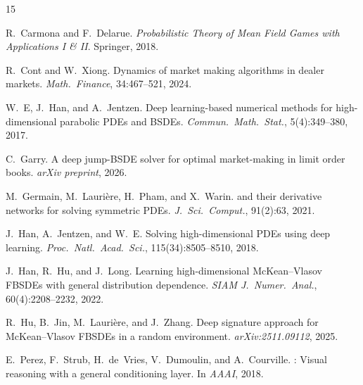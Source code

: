 \documentclass[11pt,a4paper]{article}
\begin{document}
\begin{thebibliography}{15}

R.~Carmona and F.~Delarue.
\newblock \emph{Probabilistic Theory of Mean Field Games with Applications {I \& II}}.
\newblock Springer, 2018.

R.~Cont and W.~Xiong.
\newblock Dynamics of market making algorithms in dealer markets.
\newblock \emph{Math.\ Finance}, 34:467--521, 2024.

W.~E, J.~Han, and A.~Jentzen.
\newblock Deep learning-based numerical methods for high-dimensional parabolic PDEs and BSDEs.
\newblock \emph{Commun.\ Math.\ Stat.}, 5(4):349--380, 2017.

C.~Garry.
\newblock A deep jump-{BSDE} solver for optimal market-making in limit order books.
\newblock \emph{arXiv preprint}, 2026.

M.~Germain, M.~Lauri\`ere, H.~Pham, and X.~Warin.
 and their derivative networks for solving symmetric {PDE}s.
\newblock \emph{J.\ Sci.\ Comput.}, 91(2):63, 2021.

J.~Han, A.~Jentzen, and W.~E.
\newblock Solving high-dimensional PDEs using deep learning.
\newblock \emph{Proc.\ Natl.\ Acad.\ Sci.}, 115(34):8505--8510, 2018.

J.~Han, R.~Hu, and J.~Long.
\newblock Learning high-dimensional {McKean--Vlasov} FBSDEs with general distribution dependence.
\newblock \emph{SIAM J.\ Numer.\ Anal.}, 60(4):2208--2232, 2022.

R.~Hu, B.~Jin, M.~Lauri\`ere, and J.~Zhang.
\newblock Deep signature approach for {McKean--Vlasov FBSDEs} in a random environment.
\newblock \emph{arXiv:2511.09112}, 2025.

E.~Perez, F.~Strub, H.~de~Vries, V.~Dumoulin, and A.~Courville.
: Visual reasoning with a general conditioning layer.
\newblock In \emph{AAAI}, 2018.

\end{thebibliography}
\end{document}
